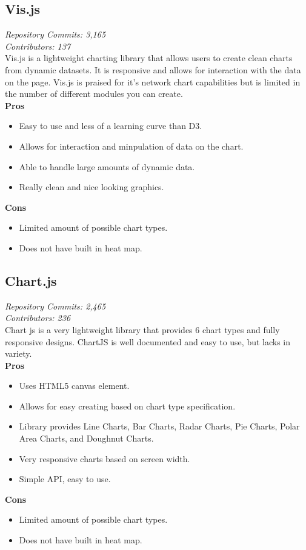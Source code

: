\documentclass[onecolumn, draftclsnofoot,10pt, compsoc]{IEEEtran}
\begin{document}
\subsection{Vis.js}
\textit{Repository Commits: 3,165}\\
\textit{Contributors: 137}\\
Vis.js is a lightweight charting library that allows users to create clean charts from dynamic datasets. It is responsive and allows for interaction with the data on the page. Vis.js is praised for it's network chart capabilities but is limited in the number of different modules you can create.\\
\textbf{Pros}
\begin{itemize}
\item Easy to use and less of a learning curve than D3.
\item Allows for interaction and minpulation of data on the chart.
\item Able to handle large amounts of dynamic data.
\item Really clean and nice looking graphics.
\end{itemize}
\textbf{Cons}
\begin{itemize}
\item Limited amount of possible chart types.
\item Does not have built in heat map.
\end{itemize}
\subsection{Chart.js}
\textit{Repository Commits: 2,465}\\ 
\textit{Contributors: 236}\\
Chart js is a very lightweight library that provides 6 chart types and fully responsive designs. ChartJS is well documented and easy to use, but lacks in variety.\\
\textbf{Pros}
\begin{itemize}
\item Uses HTML5 canvas element.
\item Allows for easy creating based on chart type specification.
\item Library provides Line Charts, Bar Charts, Radar Charts, Pie Charts, Polar Area Charts, and Doughnut Charts.
\item Very responsive charts based on screen width.
\item Simple API, easy to use.
\end{itemize}
\textbf{Cons}
\begin{itemize}
\item Limited amount of possible chart types.
\item Does not have built in heat map.
\end{itemize}
\end{document}
